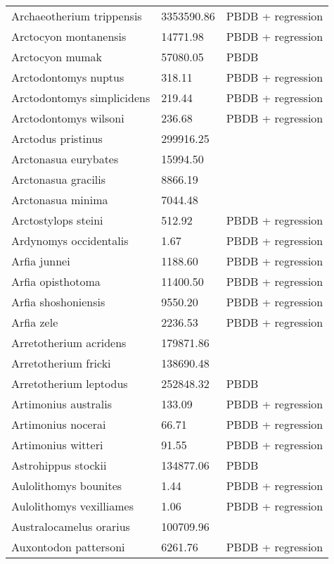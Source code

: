\documentclass{article}
\begin{document}
\begin{center}
\begin{longtable}{p{} p{} p{}}
    Archaeotherium trippensis & 3353590.86 & PBDB + regression \\ 
    Arctocyon montanensis & 14771.98 & PBDB + regression \\ 
    Arctocyon mumak & 57080.05 & PBDB \\ 
    Arctodontomys nuptus & 318.11 & PBDB + regression \\ 
    Arctodontomys simplicidens & 219.44 & PBDB + regression \\ 
    Arctodontomys wilsoni & 236.68 & PBDB + regression \\ 
    Arctodus pristinus & 299916.25 & \cite{Smith2004} \\ 
    Arctonasua eurybates & 15994.50 & \cite{Tomiya2013} \\ 
    Arctonasua gracilis & 8866.19 & \cite{Tomiya2013} \\ 
    Arctonasua minima & 7044.48 & \cite{Tomiya2013} \\ 
    Arctostylops steini & 512.92 & PBDB + regression \\ 
    Ardynomys occidentalis & 1.67 & PBDB + regression \\ 
    Arfia junnei & 1188.60 & PBDB + regression \\ 
    Arfia opisthotoma & 11400.50 & PBDB + regression \\ 
    Arfia shoshoniensis & 9550.20 & PBDB + regression \\ 
    Arfia zele & 2236.53 & PBDB + regression \\ 
    Arretotherium acridens & 179871.86 & \cite{Tomiya2013} \\ 
    Arretotherium fricki & 138690.48 & \cite{Tomiya2013} \\ 
    Arretotherium leptodus & 252848.32 & PBDB \\ 
    Artimonius australis & 133.09 & PBDB + regression \\ 
    Artimonius nocerai & 66.71 & PBDB + regression \\ 
    Artimonius witteri & 91.55 & PBDB + regression \\ 
    Astrohippus stockii & 134877.06 & PBDB \\ 
    Aulolithomys bounites & 1.44 & PBDB + regression \\ 
    Aulolithomys vexilliames & 1.06 & PBDB + regression \\ 
    Australocamelus orarius & 100709.96 & \cite{Tomiya2013} \\ 
    Auxontodon pattersoni & 6261.76 & PBDB + regression \\ 

\end{longtable}
\end{center}
\end{document}
